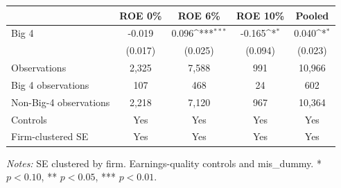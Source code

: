 \documentclass[10pt]{article}
\newcommand{\sym}[1]{\textsuperscript{#1}}
\begin{document}
\begin{minipage}{19cm}\fontsize{10}{12}\selectfont\setlength{\tabcolsep}{4pt}\renewcommand{\arraystretch}{1.15}


\def\sym#1{\ifmmode^{#1}\else\(^{#1}\)\fi}
\centering
{}
\label{tab:big4-roe-threshold-bunching}
\begin{threeparttable}
\begin{tabular}{l c c c c }
\toprule
 & ROE 0\% & ROE 6\% & ROE 10\% & Pooled \\
\midrule
Big 4 & -0.019 & 0.096\sym{***} & -0.165\sym{*} & 0.040\sym{*} \\
 & (0.017) & (0.025) & (0.094) & (0.023) \\
Observations & 2,325 & 7,588 & 991 & 10,966 \\
Big 4 observations & 107 & 468 & 24 & 602 \\
Non-Big-4 observations & 2,218 & 7,120 & 967 & 10,364 \\
\midrule
Controls & Yes & Yes & Yes & Yes \\
Firm-clustered SE & Yes & Yes & Yes & Yes \\
\bottomrule
\end{tabular}
\begin{tablenotes}\fontsize{9}{11}\selectfont
\item \raggedright \fontsize{9}{11}\selectfont \textit{Notes:} SE clustered by firm. Earnings-quality controls and mis\_dummy. * $p<0.10$, ** $p<0.05$, *** $p<0.01$.
\end{tablenotes}
\end{threeparttable}

\end{minipage}
\end{document}
